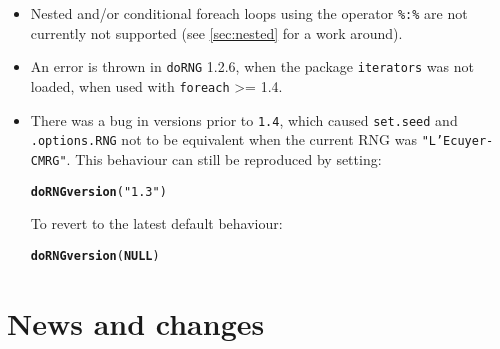 \documentclass[a4paper,12pt]{article}\usepackage[]{graphicx}\usepackage[]{color}
\makeatletter
\newcommand{\hlstr}[1]{\textcolor[rgb]{0.192,0.494,0.8}{#1}}%
\newcommand{\hlstd}[1]{\textcolor[rgb]{0.345,0.345,0.345}{#1}}%
\newcommand{\hlkwa}[1]{\textcolor[rgb]{0.161,0.373,0.58}{\textbf{#1}}}%
\newcommand{\hlkwd}[1]{\textcolor[rgb]{0.737,0.353,0.396}{\textbf{#1}}}%
\newenvironment{kframe}{%
 \def\at@end@of@kframe{}%
 \ifinner\ifhmode%
  \def\at@end@of@kframe{\end{minipage}}%
  \begin{minipage}{\columnwidth}%
 \fi\fi%
 \def\FrameCommand##1{\hskip\@totalleftmargin \hskip-\fboxsep
 \colorbox{shadecolor}{##1}\hskip-\fboxsep
     \hskip-\linewidth \hskip-\@totalleftmargin \hskip\columnwidth}%
 \MakeFramed {\advance\hsize-\width
   \@totalleftmargin\z@ \linewidth\hsize
   \@setminipage}}%
 {\par\unskip\endMakeFramed%
 \at@end@of@kframe}
\newenvironment{knitrout}{}{} %
\let\code=\texttt
\makeatother
\begin{document}
\begin{itemize}
\item Nested and/or conditional foreach loops using the operator \code{\%:\%} are not 
currently not supported (see \cref{sec:nested} for a work around).
\item An error is thrown in \code{doRNG} 1.2.6, when the package \code{iterators} was not loaded, when used with 
\code{foreach} >= 1.4.
\item There was a bug in versions prior to \code{1.4}, which caused \code{set.seed} and 
\code{.options.RNG} not to be equivalent when the current RNG was \code{"L'Ecuyer-CMRG"}.
This behaviour can still be reproduced by setting:
\begin{knitrout}\footnotesize
{}\color{fgcolor}\begin{kframe}
\begin{alltt}
\hlkwd{doRNGversion}\hlstd{(}\hlstr{"1.3"}\hlstd{)}
\end{alltt}
\end{kframe}
\end{knitrout}

To revert to the latest default behaviour:
\begin{knitrout}\footnotesize
{}\color{fgcolor}\begin{kframe}
\begin{alltt}
\hlkwd{doRNGversion}\hlstd{(}\hlkwa{NULL}\hlstd{)}
\end{alltt}
\end{kframe}
\end{knitrout}

\end{itemize} 

\section{News and changes}
\end{document}
